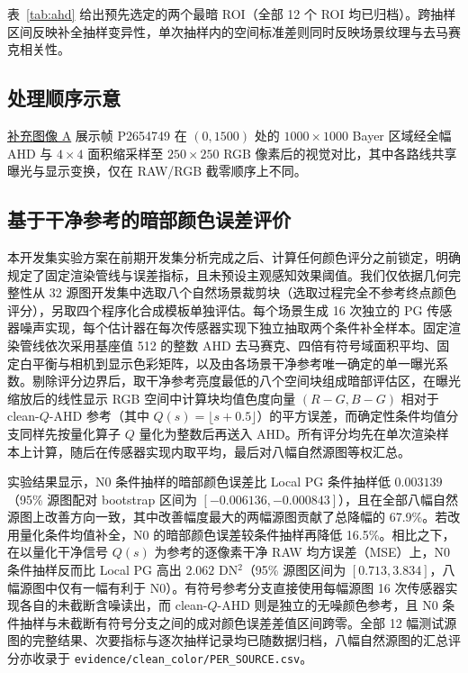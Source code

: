 \documentclass[10pt,twocolumn,journal]{IEEEtran}
\begin{document}
表~\ref{tab:ahd} 给出预先选定的两个最暗 ROI（全部 12 个 ROI 均已归档）。跨抽样区间反映补全抽样变异性，单次抽样内的空间标准差则同时反映场景纹理与去马赛克相关性。

\subsection{处理顺序示意}
\href{visual_zh.pdf}{补充图像 A} 展示帧 P2654749 在 $(0,1500)$ 处的 $1000\times1000$ Bayer 区域经全幅 AHD 与 $4\times4$ 面积缩采样至 $250\times250$ RGB 像素后的视觉对比，其中各路线共享曝光与显示变换，仅在 RAW/RGB 截零顺序上不同。

\subsection{基于干净参考的暗部颜色误差评价}\label{sec:cleanendpoint}
本开发集实验方案在前期开发集分析完成之后、计算任何颜色评分之前锁定，明确规定了固定渲染管线与误差指标，且未预设主观感知效果阈值。我们仅依据几何完整性从 32 源图开发集中选取八个自然场景裁剪块（选取过程完全不参考终点颜色评分），另取四个程序化合成模板单独评估。每个场景生成 16 次独立的 PG 传感器噪声实现，每个估计器在每次传感器实现下独立抽取两个条件补全样本。固定渲染管线依次采用基座值 512 的整数 AHD 去马赛克、四倍有符号域面积平均、固定白平衡与相机到显示色彩矩阵，以及由各场景干净参考唯一确定的单一曝光系数。剔除评分边界后，取干净参考亮度最低的八个空间块组成暗部评估区，在曝光缩放后的线性显示 RGB 空间中计算块均值色度向量 $(R-G,B-G)$ 相对于 clean-$Q$-AHD 参考（其中 $Q(s)=\lfloor s+0.5\rfloor$）的平方误差，而确定性条件均值分支同样先按量化算子 $Q$ 量化为整数后再送入 AHD。所有评分均先在单次渲染样本上计算，随后在传感器实现内取平均，最后对八幅自然源图等权汇总。

实验结果显示，N0 条件抽样的暗部颜色误差比 Local PG 条件抽样低 $0.003139$（95\% 源图配对 bootstrap 区间为 $[-0.006136,-0.000843]$），且在全部八幅自然源图上改善方向一致，其中改善幅度最大的两幅源图贡献了总降幅的 67.9\%。若改用量化条件均值补全，N0 的暗部颜色误差较条件抽样再降低 16.5\%。相比之下，在以量化干净信号 $Q(s)$ 为参考的逐像素干净 RAW 均方误差（MSE）上，N0 条件抽样反而比 Local PG 高出 $2.062$ DN$^2$（95\% 源图区间为 $[0.713,3.834]$，八幅源图中仅有一幅有利于 N0）。有符号参考分支直接使用每幅源图 16 次传感器实现各自的未截断含噪读出，而 clean-$Q$-AHD 则是独立的无噪颜色参考，且 N0 条件抽样与未截断有符号分支之间的成对颜色误差差值区间跨零。全部 12 幅测试源图的完整结果、次要指标与逐次抽样记录均已随数据归档，八幅自然源图的汇总评分亦收录于 \texttt{evidence/clean\_color/}\allowbreak\texttt{PER\_SOURCE.csv}。
\end{document}
